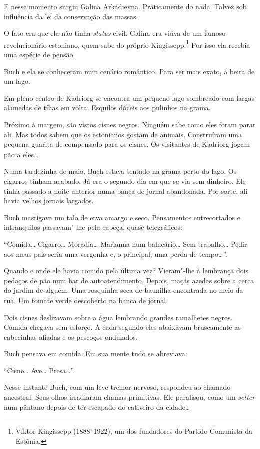 E nesse momento surgiu Galina Arkádievna. Praticamente do nada. Talvez
sob influência da lei da conservação das massas.

O fato era que ela não tinha \emph{status} civil. Galina era viúva de um
famoso revolucionário estoniano, quem sabe do próprio
Kingissepp.\footnote{Víktor Kingissepp (1888--1922), um dos fundadores
  do Partido Comunista da Estônia.} Por isso ela recebia uma espécie de
pensão.

Buch e ela se conheceram num cenário romântico. Para ser mais exato, à
beira de um lago.

Em pleno centro de Kadriorg se encontra um pequeno lago sombreado com
largas alamedas de tílias em volta. Esquilos dóceis aos pulinhos na
grama.

Próximo à margem, são vistos cisnes negros. Ninguém sabe como eles foram parar ali.
Mas todos sabem que os estonianos gostam de animais. Construíram uma
pequena guarita de compensado para os cisnes. Os visitantes de Kadriorg
jogam pão a eles\ldots{}

Numa tardezinha de maio, Buch estava sentado na grama perto do lago. Os
cigarros tinham acabado. Já era o segundo dia em que se via sem
dinheiro. Ele tinha passado a noite anterior numa banca de jornal
abandonada. Por sorte, ali havia velhos jornais largados.

Buch mastigava um talo de erva amargo e seco. Pensamentos entrecortados
e intranquilos passavam"-lhe pela cabeça, quase telegráficos:

``Comida\ldots{} Cigarro\ldots{} Moradia\ldots{} Marianna num balneário\ldots{} Sem
trabalho\ldots{} Pedir aos meus pais seria uma vergonha e, o principal, uma perda de
tempo\ldots{}''.

Quando e onde ele havia comido pela última vez? Vieram"-lhe à lembrança
dois pedaços de pão num bar de autoatendimento.
Depois, maçãs azedas sobre a cerca do jardim de alguém. Uma rosquinha
seca de baunilha encontrada no meio da rua. Um tomate verde descoberto
na banca de jornal.

Dois cisnes deslizavam sobre a água lembrando grandes ramalhetes negros.
Comida chegava sem esforço. A cada segundo eles abaixavam bruscamente as
cabecinhas afiadas e os pescoços ondulados.

Buch pensava em comida. Em sua mente tudo se abreviava:

``Cisne\ldots{} Ave\ldots{} Presa\ldots{}''.

Nesse instante Buch, com um leve tremor nervoso, respondeu ao chamado
ancestral. Seus olhos irradiaram chamas primitivas. Ele paralisou, como
um \emph{setter} num pântano depois de ter escapado do cativeiro da
cidade\ldots{}

